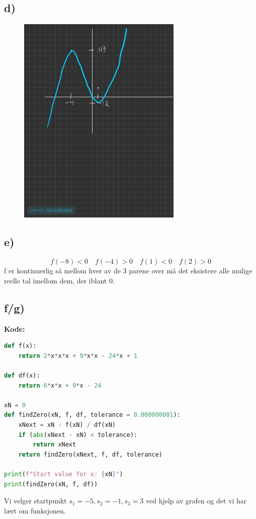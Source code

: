 \documentclass[12pt]{article}
\begin{document}
\subsection*{d)} 
\begin{figure}[h]
    \centering
    \includegraphics[width=0.7\textwidth]{./MatOblig3.jpg}
    \label{fig:bilde}
\end{figure}

\subsection*{e)}
\[
  f(-8) < 0 \quad f(-4) > 0 \quad f(1) < 0 \quad f(2) > 0
\]
f er kontinuerlig så mellom hver av de 3 parene over må det eksistere alle mulige reelle tal imellom dem, der iblant 0. 

\subsection*{f/g)}
\textbf{Kode: }
\begin{lstlisting}[language=Python]
def f(x):
    return 2*x*x*x + 9*x*x - 24*x + 1

def df(x):
    return 6*x*x + 9*x - 24

xN = 0 
def findZero(xN, f, df, tolerance = 0.000000001):
    xNext = xN - f(xN) / df(xN)
    if (abs(xNext - xN) < tolerance):
        return xNext
    return findZero(xNext, f, df, tolerance)

print(f"Start value for x: {xN}")
print(findZero(xN, f, df))
\end{lstlisting}

\noindent 
Vi velger startpunkt \(s_1 = -5, s_2 = -1, s_3 = 3\) ved hjelp av grafen og det vi 
har lært om funksjonen.
\end{document}
